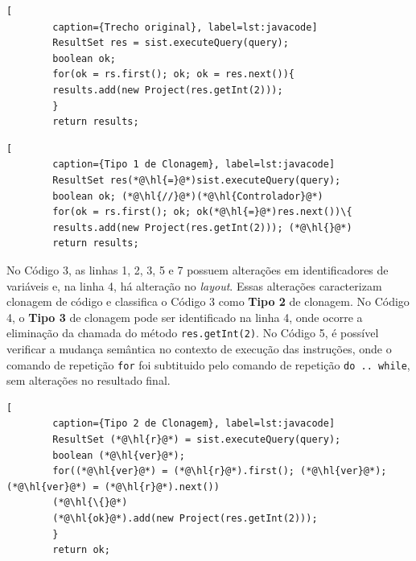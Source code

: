 \begin{scriptsize}
	\label{original}
	\estiloJava
	\begin{singlespace}
		\begin{lstlisting}[
		caption={Trecho original}, label=lst:javacode]
		ResultSet res = sist.executeQuery(query);
		boolean ok;
		for(ok = rs.first(); ok; ok = res.next()){
		results.add(new Project(res.getInt(2)));
		}
		return results;
		\end{lstlisting}
	\end{singlespace}
\end{scriptsize}

\begin{scriptsize}
	\label{tipo1}
	\estiloJava
	\begin{singlespace}
		\begin{lstlisting}[
		caption={Tipo 1 de Clonagem}, label=lst:javacode]
		ResultSet res(*@\hl{=}@*)sist.executeQuery(query);
		boolean ok; (*@\hl{//}@*)(*@\hl{Controlador}@*) 
		for(ok = rs.first(); ok; ok(*@\hl{=}@*)res.next())\{
		results.add(new Project(res.getInt(2))); (*@\hl{}@*) 
		return results;
		\end{lstlisting}
	\end{singlespace}
\end{scriptsize}

No Código 3, as linhas 1, 2, 3, 5 e 7 possuem alterações em identificadores de variáveis e, na linha 4, há alteração no \textit{layout}. Essas alterações caracterizam clonagem de código e classifica o Código 3 como \textbf{Tipo 2} de clonagem. No Código 4, o \textbf{Tipo 3} de clonagem pode ser identificado na linha 4, onde ocorre a eliminação da chamada do método \texttt{res.getInt(2)}. No Código 5, é possível verificar a mudança semântica no contexto de execução das instruções, onde o comando de repetição \texttt{for} foi subtituido pelo comando de repetição \texttt{do .. while}, sem alterações no resultado final.\\

\begin{scriptsize}
	\label{tipo2}
	\estiloJava
	\begin{singlespace}
		\begin{lstlisting}[
		caption={Tipo 2 de Clonagem}, label=lst:javacode]
		ResultSet (*@\hl{r}@*) = sist.executeQuery(query);
		boolean (*@\hl{ver}@*);
		for((*@\hl{ver}@*) = (*@\hl{r}@*).first(); (*@\hl{ver}@*); (*@\hl{ver}@*) = (*@\hl{r}@*).next())
		(*@\hl{\{}@*)
		(*@\hl{ok}@*).add(new Project(res.getInt(2)));
		}
		return ok;
		\end{lstlisting}
	\end{singlespace}
\end{scriptsize}

